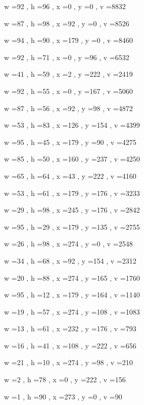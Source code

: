 \documentclass[11pt]{article}
\begin{document}
w =92 , h =96 , x =0 , y =0 , v =8832
\par
w =87 , h =98 , x =92 , y =0 , v =8526
\par
w =94 , h =90 , x =179 , y =0 , v =8460
\par
w =92 , h =71 , x =0 , y =96 , v =6532
\par
w =41 , h =59 , x =2 , y =222 , v =2419
\par
w =92 , h =55 , x =0 , y =167 , v =5060
\par
w =87 , h =56 , x =92 , y =98 , v =4872
\par
w =53 , h =83 , x =126 , y =154 , v =4399
\par
w =95 , h =45 , x =179 , y =90 , v =4275
\par
w =85 , h =50 , x =160 , y =237 , v =4250
\par
w =65 , h =64 , x =43 , y =222 , v =4160
\par
w =53 , h =61 , x =179 , y =176 , v =3233
\par
w =29 , h =98 , x =245 , y =176 , v =2842
\par
w =95 , h =29 , x =179 , y =135 , v =2755
\par
w =26 , h =98 , x =274 , y =0 , v =2548
\par
w =34 , h =68 , x =92 , y =154 , v =2312
\par
w =20 , h =88 , x =274 , y =165 , v =1760
\par
w =95 , h =12 , x =179 , y =164 , v =1140
\par
w =19 , h =57 , x =274 , y =108 , v =1083
\par
w =13 , h =61 , x =232 , y =176 , v =793
\par
w =16 , h =41 , x =108 , y =222 , v =656
\par
w =21 , h =10 , x =274 , y =98 , v =210
\par
w =2 , h =78 , x =0 , y =222 , v =156
\par
w =1 , h =90 , x =273 , y =0 , v =90
\par
\newpage
\end{document}
